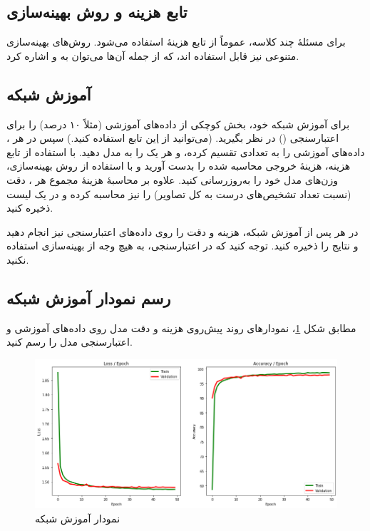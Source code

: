 \documentclass{article}
\begin{document}
\subsection*{تابع هزینه و روش بهینه‌سازی}

برای مسئلهٔ
چند کلاسه، عموماً از تابع هزینهٔ
\hyperref{https://pytorch.org/docs/master/generated/torch.nn.functional.cross_entropy.html}{}{}{}
استفاده می‌شود. روش‌های بهینه‌سازی متنوعی نیز قابل استفاده اند، که از جمله آن‌ها می‌توان به
\hyperref{https://pytorch.org/docs/master/generated/torch.optim.Adam.html}{}{}{}
و
\hyperref{https://pytorch.org/docs/master/generated/torch.optim.SGD.html}{}{}{}
اشاره کرد.

\subsection*{آموزش شبکه}

برای آموزش شبکه خود، بخش کوچکی از داده‌های آموزشی (مثلاً ۱۰ درصد) را برای اعتبارسنجی
()
در نظر بگیرید. (می‌توانید از
\hyperref{https://scikit-learn.org/stable/modules/generated/sklearn.model_selection.train_test_split.html}{}{}{این}
تابع استفاده کنید.) سپس در هر
،
داده‌های آموزشی را به تعدادی
تقسیم کرده، و هر یک را به مدل دهید. با استفاده از تابع هزینه، هزینهٔ خروجی محاسبه شده را بدست آورید و با استفاده از روش بهینه‌سازی، وزن‌های مدل خود را به‌روزرسانی کنید. علاوه بر محاسبهٔ هزینهٔ مجموع هر
،
دقت (نسبت تعداد تشخیص‌های درست به کل تصاویر) را نیز محاسبه کرده و در یک لیست ذخیره کنید.

در هر
پس از آموزش شبکه، هزینه و دقت را روی داده‌های اعتبارسنجی نیز انجام دهید و نتایج را ذخیره کنید. توجه کنید که در اعتبارسنجی، به هیچ وجه از بهینه‌سازی استفاده نکنید.

\subsection*{رسم نمودار آموزش شبکه}

مطابق شکل
\ref{fig:TrainingCurve}،
نمودارهای روند پیش‌روی هزینه و دقت مدل روی داده‌های آموزشی و اعتبارسنجی مدل را رسم کنید.

\begin{figure}[ht]
\begin{center}
\includegraphics[width=\linewidth]{images/TrainingCurve.png}
\caption{نمودار آموزش شبکه}
\label{fig:TrainingCurve}
\end{center}
\end{figure}
\end{document}
